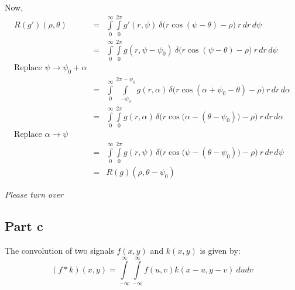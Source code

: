 \documentclass[12pt]{article}
\begin{document}
Now, 
\begin{eqnarray*}
	R(g')(\rho, \theta) &=& \int \limits_{0}^\infty \int \limits_{0}^{2\pi} g'(r, \psi) \: \delta\bigg(r \cos(\psi - \theta) - \rho\bigg) \: r\, dr\, d\psi\\
	&=& \int \limits_{0}^\infty \int \limits_{0}^{2\pi} g(r, \psi - \psi_0) \: \delta\bigg(r \cos(\psi  - \theta) - \rho\bigg) \: r\, dr\, d\psi\\
	\text{Replace }\psi \rightarrow \psi_0 + \alpha &&\\
	&=& \int \limits_0^\infty \int \limits_{-\psi_0}^{2\pi-\psi_0}g(r, \alpha)\, \delta\bigg(r \cos(\alpha + \psi_0 - \theta) - \rho\bigg) \: r\,dr\,d\alpha\\
	&=& \int \limits_0^\infty \int \limits_{0}^{2\pi} g(r, \alpha)\, \delta\bigg(r \cos \big(\alpha - (\theta - \psi_0)\big) - \rho\bigg)\: r \,dr\,d\alpha\\
	\text{Replace } \alpha \rightarrow \psi&&\\
	&=&	\int \limits_0^\infty \int \limits_{0}^{2\pi} g(r, \psi)\, \delta\bigg(r \cos \big(\psi - (\theta - \psi_0)\big) - \rho\bigg)\: r \,dr\,d\psi\\
	&=& R(g)(\rho, \theta - \psi_0)
\end{eqnarray*}
\vspace{3cm}
\begin{center}
\textit{Please turn over}
\end{center}
\newpage
\subsection*{Part c}
The convolution of two signals $f(x, y)$ and $k(x, y)$ is given by:
$$(f * k)(x, y) = \int \limits_{-\infty}^\infty \int \limits_{-\infty}^\infty f(u, v) k(x-u, y-v)\: dudv$$
\end{document}
